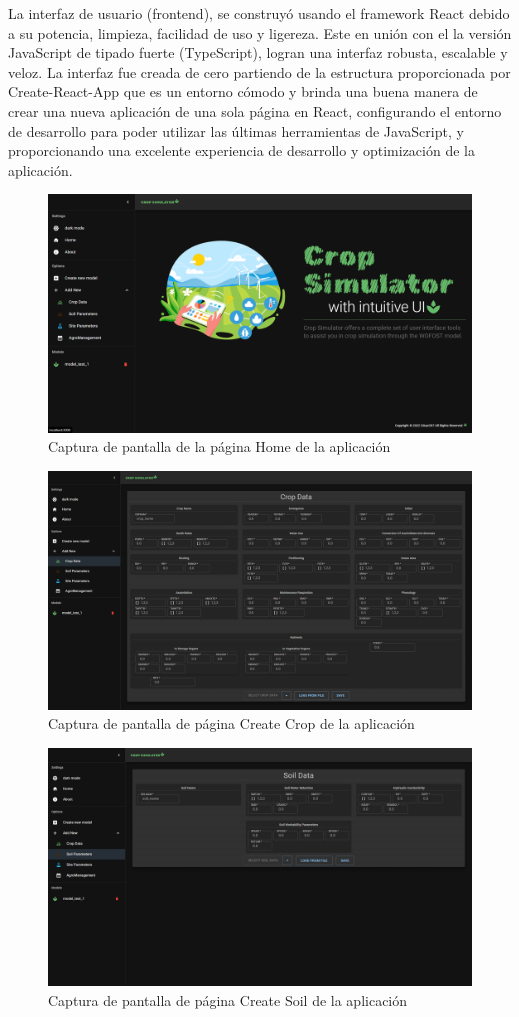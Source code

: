 La interfaz de usuario (frontend), se construyó usando el framework React debido a su potencia, limpieza, facilidad de uso y ligereza. Este en unión con el la versión JavaScript de tipado fuerte (TypeScript), logran una interfaz robusta, escalable y veloz.
La interfaz fue creada de cero partiendo de la estructura proporcionada por Create-React-App que es un entorno cómodo y brinda una buena manera de crear una nueva aplicación de una sola página en React, configurando el entorno de desarrollo para poder utilizar las últimas herramientas de JavaScript, y proporcionando una excelente experiencia de desarrollo y optimización de la aplicación.

\begin{figure}[!h]
	\centering
	\includegraphics[width=0.6\linewidth]{Images/fron-home}
	\caption{Captura de pantalla de la página Home de la aplicación}
	\label{fig:fron-home}
\end{figure}

\begin{figure}[!h]
	\centering
	\includegraphics[width=0.6\linewidth]{Images/crop-page}
	\caption{Captura de pantalla de página Create Crop de la aplicación}
	\label{fig:crop-page}
\end{figure}

\begin{figure}[!h]
	\centering
	\includegraphics[width=0.6\linewidth]{Images/soil-page}
	\caption{Captura de pantalla de página Create Soil de la aplicación}
	\label{fig:soil-page}
\end{figure}

